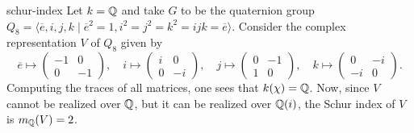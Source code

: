 \begin{example}{schur-index}
    Let $k = \mathbb{Q}$ and take $G$ to be the quaternion group $Q_8 = \langle \overline{e}, i, j, k \mid \overline{e}^2 = 1, i^2 = j^2 = k^2 = ijk = \overline{e} \rangle$. Consider the complex representation $V$ of $Q_8$ given by
    \[ \overline{e} \mapsto \begin{pmatrix} -1 & 0 \\ 0 & -1 \end{pmatrix}, \quad i \mapsto \begin{pmatrix} i & 0 \\ 0 & -i \end{pmatrix}, \quad j \mapsto \begin{pmatrix} 0 & -1 \\ 1 & 0 \end{pmatrix}, \quad k \mapsto \begin{pmatrix} 0 & -i \\ -i & 0 \end{pmatrix} . \]
    Computing the traces of all matrices, one sees that $k(\chi) = \mathbb{Q}$. Now, since $V$ cannot be realized over $\mathbb{Q}$, but it can be realized over $\mathbb{Q}(i)$, the Schur index of $V$ is $m_{\mathbb{Q}}(V) = 2$.
\end{example}
